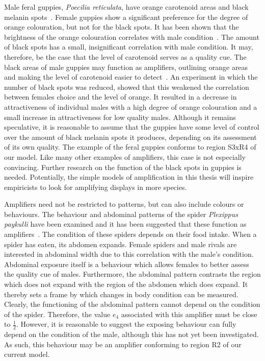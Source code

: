 \documentclass[a4paper,12pt]{article}
\numberwithin{equation}{section}
\begin{document}
Male feral guppies, \textit{Poecilia reticulata}, have orange carotenoid areas and black melanin spots~\cite{Brooks1995}. Female guppies show a significant preference for the degree of orange colouration, but not for the black spots. It has been shown that the brightness of the orange colouration correlates with male condition~\cite{Nicoletto1993}. The amount of black spots has a small, insignificant correlation with male condition. It may, therefore, be the case that the level of carotenoid serves as a quality cue. The black areas of male guppies may function as amplifiers, outlining orange areas and making the level of carotenoid easier to detect~\cite{Brooks1996}. An experiment in which the number of black spots was reduced, showed that this weakened the correlation between females choice and the level of orange. It resulted in a decrease in attractiveness of individual males with a high degree of orange colouration and a small increase in attractiveness for low quality males. Although it remains speculative, it is reasonable to assume that the guppies have some level of control over the amount of black melanin spots it produces, depending on its assessment of its own quality. The example of the feral guppies conforms to region S3xR4 of our model. Like many other examples of amplifiers, this case is not especially convincing. Further research on the function of the black spots in guppies is needed. Potentially, the simple models of amplification in this thesis will inspire empiricists to look for amplifying displays in more species.

Amplifiers need not be restricted to patterns, but can also include colours or behaviours. The behaviour and abdominal patterns of the spider \textit{Plexippus paykulli} have been examined and it has been suggested that these function as amplifiers~\cite{Taylor2000}. The condition of these spiders depends on their food intake. When a spider has eaten, its abdomen expands. Female spiders and male rivals are interested in abdominal width due to this correlation with the male's condition. Abdominal exposure itself is a behaviour which allows females to better assess the quality cue of males. Furthermore, the abdominal pattern contrasts the region which does not expand with the region of the abdomen which does expand. It thereby sets a frame by which changes in body condition can be measured. Clearly, the functioning of the abdominal pattern cannot depend on the condition of the spider. Therefore, the value $e_{4}$ associated with this amplifier must be close to $\frac{1}{2}$. However, it is reasonable to suggest the exposing behaviour can fully depend on the condition of the male, although this has not yet been investigated. As such, this behaviour may be an amplifier conforming to region R2 of our current model.
\end{document}
